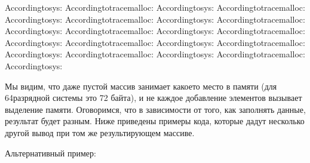 \documentclass[letterpaper,10pt,russian]{sphinxmanual}
\begin{document}
\begin{sphinxVerbatim}[commandchars=\\\{\}]
Accordingtosys:
Accordingtotracemalloc:
Accordingtosys:
Accordingtotracemalloc:
Accordingtosys:
Accordingtotracemalloc:
Accordingtosys:
Accordingtotracemalloc:
Accordingtosys:
Accordingtotracemalloc:
Accordingtosys:
Accordingtotracemalloc:
Accordingtosys:
Accordingtotracemalloc:
Accordingtosys:
Accordingtotracemalloc:
Accordingtosys:
Accordingtotracemalloc:
Accordingtosys:
Accordingtotracemalloc:
Accordingtosys:
\end{sphinxVerbatim}

\sphinxAtStartPar
Мы видим, что даже пустой массив занимает какое\sphinxhyphen{}то место в памяти (для 64\sphinxhyphen{}разрядной системы это 72 байта), и не каждое добавление элементов вызывает выделение памяти. Оговоримся, что в зависимости от того, как заполнять данные, результат будет разным. Ниже приведены примеры кода, которые дадут несколько другой вывод при том же результирующем массиве.

\sphinxAtStartPar
Альтернативный пример:
\end{document}

